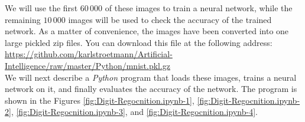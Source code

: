 We will use the first $60\,000$ of these images to train a neural network, while the remaining $10\,000$ images
will be used to check the accuracy of the trained network.  As a matter of convenience, the images have been
converted into one large pickled zip files.  You can download this file at the following address:
\\[0.2cm]
\hspace*{1.3cm}
\href{https://github.com/karlstroetmann/Artificial-Intelligence/raw/master/Python/mnist.pkl.gz}{https://github.com/karlstroetmann/Artificial-Intelligence/raw/master/Python/mnist.pkl.gz}
\\[0.2cm]
We will next describe a \textsl{Python} program that loads these images, trains a neural network on it, and
finally evaluates the accuracy of the network.  The program is shown in the Figures
\ref{fig:Digit-Regocnition.ipynb-1}, \ref{fig:Digit-Regocnition.ipynb-2}, \ref{fig:Digit-Regocnition.ipynb-3},
and \ref{fig:Digit-Regocnition.ipynb-4}.


